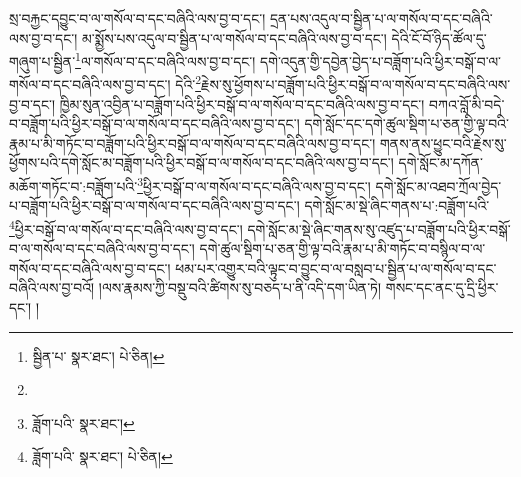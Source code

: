 སྲ་བརྐྱང་དབྱུང་བ་ལ་གསོལ་བ་དང་བཞིའི་ལས་བྱ་བ་དང་། དྲན་པས་འདུལ་བ་སྦྱིན་པ་ལ་གསོལ་བ་དང་བཞིའི་ལས་བྱ་བ་དང་། མ་སྨྱོས་པས་འདུལ་བ་སྦྱིན་པ་ལ་གསོལ་བ་དང་བཞིའི་ལས་བྱ་བ་དང་། དེའི་ངོ་བོ་ཉིད་ཚོལ་དུ་གཞུག་པ་སྦྱིན་\footnote{སྦྱིན་པ་  སྣར་ཐང་།  པེ་ཅིན། }ལ་གསོལ་བ་དང་བཞིའི་ལས་བྱ་བ་དང་། དགེ་འདུན་གྱི་དབྱེན་བྱེད་པ་བཟློག་པའི་ཕྱིར་བསྒོ་བ་ལ་གསོལ་བ་དང་བཞིའི་ལས་བྱ་བ་དང་། དེའི་\footnote{}རྗེས་སུ་ཕྱོགས་པ་བཟློག་པའི་ཕྱིར་བསྒོ་བ་ལ་གསོལ་བ་དང་བཞིའི་ལས་བྱ་བ་དང་། ཁྱིམ་སུན་འབྱིན་པ་བཟློག་པའི་ཕྱིར་བསྒོ་བ་ལ་གསོལ་བ་དང་བཞིའི་ལས་བྱ་བ་དང་། བཀའ་བློ་མི་བདེ་བ་བཟློག་པའི་ཕྱིར་བསྒོ་བ་ལ་གསོལ་བ་དང་བཞིའི་ལས་བྱ་བ་དང་། དགེ་སློང་དང་དགེ་ཚུལ་སྡིག་པ་ཅན་གྱི་ལྟ་བའི་རྣམ་པ་མི་གཏོང་བ་བཟློག་པའི་ཕྱིར་བསྒོ་བ་ལ་གསོལ་བ་དང་བཞིའི་ལས་བྱ་བ་དང་། གནས་ནས་ཕྱུང་བའི་རྗེས་སུ་ཕྱོགས་པའི་དགེ་སློང་མ་བཟློག་པའི་ཕྱིར་བསྒོ་བ་ལ་གསོལ་བ་དང་བཞིའི་ལས་བྱ་བ་དང་། དགེ་སློང་མ་དཀོན་མཆོག་གཏོང་བ་:བཟློག་པའི་\footnote{ཟློག་པའི་  སྣར་ཐང་། }ཕྱིར་བསྒོ་བ་ལ་གསོལ་བ་དང་བཞིའི་ལས་བྱ་བ་དང་། དགེ་སློང་མ་འཐབ་ཀྲོལ་བྱེད་པ་བཟློག་པའི་ཕྱིར་བསྒོ་བ་ལ་གསོལ་བ་དང་བཞིའི་ལས་བྱ་བ་དང་། དགེ་སློང་མ་སྡེ་ཞིང་གནས་པ་:བཟློག་པའི་\footnote{ཟློག་པའི་  སྣར་ཐང་།  པེ་ཅིན། }ཕྱིར་བསྒོ་བ་ལ་གསོལ་བ་དང་བཞིའི་ལས་བྱ་བ་དང་། དགེ་སློང་མ་སྡེ་ཞིང་གནས་སུ་འཛུད་པ་བཟློག་པའི་ཕྱིར་བསྒོ་བ་ལ་གསོལ་བ་དང་བཞིའི་ལས་བྱ་བ་དང་། དགེ་ཚུལ་སྡིག་པ་ཅན་གྱི་ལྟ་བའི་རྣམ་པ་མི་གཏོང་བ་བསྙིལ་བ་ལ་གསོལ་བ་དང་བཞིའི་ལས་བྱ་བ་དང་། ཕམ་པར་འགྱུར་བའི་ལྟུང་བ་བྱུང་བ་ལ་བསླབ་པ་སྦྱིན་པ་ལ་གསོལ་བ་དང་བཞིའི་ལས་བྱ་བའོ། །ལས་རྣམས་ཀྱི་བསྡུ་བའི་ཚིགས་སུ་བཅད་པ་ནི་འདི་དག་ཡིན་ཏེ། གསང་དང་ནང་དུ་དྲི་ཕྱིར་དང་། །
